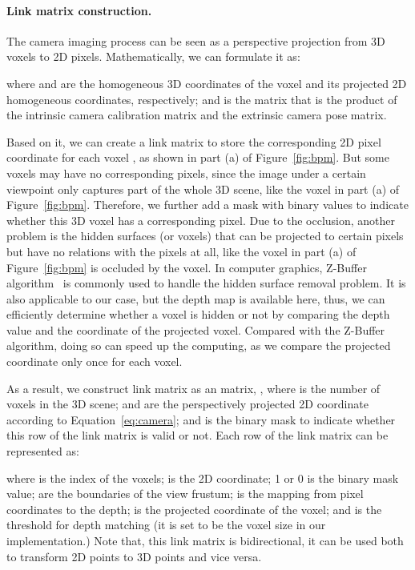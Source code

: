 \documentclass[final]{cvpr}
\begin{document}
\vspace{-4mm}
\paragraph{Link matrix construction.}
The camera imaging process can be seen as a perspective projection from 3D voxels to 2D pixels.
Mathematically, we can formulate it as:


where  and  are the homogeneous 3D coordinates of the  voxel and its projected 2D homogeneous coordinates, respectively; and  is the matrix that is the product of the intrinsic camera calibration matrix and the extrinsic camera pose matrix.


Based on it, we can create a link matrix  to store the corresponding 2D pixel coordinate  for each voxel , as shown in part (a) of Figure~\ref{fig:bpm}.
But some voxels may have no corresponding pixels, since the image under a certain viewpoint only captures part of the whole 3D scene, like the  voxel in part (a) of Figure~\ref{fig:bpm}.
Therefore, we further add a mask  with binary values to indicate whether this 3D voxel has a corresponding pixel.
Due to the occlusion, another problem is the hidden surfaces (or voxels) that can be projected to certain pixels but have no relations with the pixels at all, like the  voxel in part (a) of Figure~\ref{fig:bpm} is occluded by the  voxel.
In computer graphics, Z-Buffer algorithm~\cite{catmull1974subdivision} is commonly used to handle the hidden surface removal problem.
It is also applicable to our case, but the depth map is available here, thus, we can efficiently determine whether a voxel is hidden or not by comparing the depth value and the  coordinate of the projected voxel.
Compared with the Z-Buffer algorithm, doing so can speed up the computing, as we compare the projected  coordinate only once for each voxel.



As a result, we construct link matrix  as an  matrix, , where  is the number of voxels in the 3D scene;  and  are the perspectively projected 2D coordinate according to Equation~\ref{eq:camera}; and  is the binary mask to indicate whether this row of the link matrix is valid or not.
Each row of the link matrix  can be represented as:

where  is the index of the voxels;  is the 2D coordinate; 1 or 0 is the binary mask value;  are the boundaries of the view frustum;  is the mapping from pixel coordinates to the depth;  is the projected  coordinate of the voxel; and  is the threshold for depth matching (it is set to be the voxel size in our implementation.) 
Note that, this link matrix is bidirectional, it can be used both to transform 2D points to 3D points and vice versa.
\end{document}
